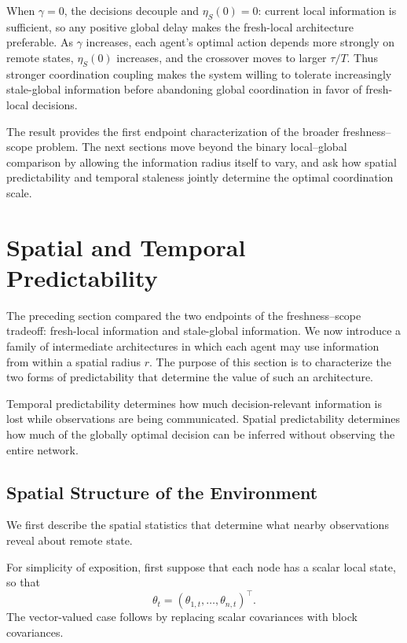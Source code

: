 \documentclass[11pt]{article}
\begin{document}
When $\gamma=0$, the decisions decouple and
$\eta_S(0)=0$: current local information is sufficient, so any
positive global delay makes the fresh-local architecture preferable. As $\gamma$
increases, each agent's optimal action depends more strongly on remote states,
$\eta_S(0)$ increases, and the crossover moves to larger
$\tau/T$. Thus stronger coordination coupling makes the system willing to
tolerate increasingly stale-global information before abandoning global
coordination in favor of fresh-local decisions.

The result provides the first endpoint characterization of the broader
freshness--scope problem. The next sections move beyond the binary
local--global comparison by allowing the information radius itself to vary,
and ask how spatial predictability and temporal staleness jointly determine
the optimal coordination scale.



\section{Spatial and Temporal Predictability}
\label{sec:spatiotemporal_predictability}

The preceding section compared the two endpoints of the
freshness--scope tradeoff: fresh-local information and stale-global
information. We now introduce a family of intermediate architectures in which
each agent may use information from within a spatial radius $r$. The purpose
of this section is to characterize the two forms of predictability that
determine the value of such an architecture.

Temporal predictability determines how much decision-relevant information is
lost while observations are being communicated. Spatial predictability
determines how much of the globally optimal decision can be inferred without
observing the entire network.

\subsection{Spatial Structure of the Environment}
\label{subsec:spatial_structure}

We first describe the spatial statistics that determine what nearby
observations reveal about remote state.

For simplicity of exposition, first suppose that each node has a scalar local
state, so that
\[
    \theta_t
    =
    (\theta_{1,t},\ldots,\theta_{n,t})^\top.
\]
The vector-valued case follows by replacing scalar covariances with block
covariances.
\end{document}

